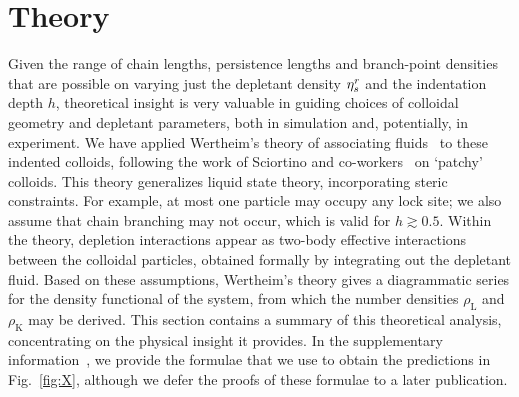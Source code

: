 \documentclass[8.5pt,oneside,onecolumn]{article}
\newcommand{\rhoL}{\rho_\mathrm{L}}
\newcommand{\rhoK}{\rho_\mathrm{K}}
\begin{document}
\section{Theory} \label{sec:theory}

Given the range of chain lengths, persistence lengths and branch-point densities that are
 possible on varying just the
depletant density $\eta_s^r$ and the indentation depth $h$, theoretical
insight is very valuable in guiding choices of colloidal geometry and
depletant parameters, both in simulation and, potentially, in
experiment.  We have applied Wertheim's theory of associating
fluids~\cite{Wertheim} to these indented colloids, following the work
of Sciortino and co-workers~\cite{Bianchi06,Sciortino2007} on `patchy'
colloids.  This theory generalizes liquid state theory, incorporating
steric constraints.  For example,
at most one particle may occupy any lock site; we also assume that
chain branching may not occur, which is valid for $h\gtrsim 0.5$. 
Within the theory, depletion interactions appear as two-body effective interactions
between the colloidal particles, obtained formally by integrating out
the depletant fluid.  Based on these assumptions, Wertheim's theory
gives a diagrammatic series for the density functional of the system,
from which the number densities $\rhoL$ and $\rhoK$ may be derived.
%
This section contains a summary of this theoretical analysis, concentrating on the physical
insight it provides.  In the supplementary information~\cite{SI}, we
provide the formulae that we use to obtain the predictions in Fig.~\ref{fig:X}, although 
we defer the proofs of these formulae to a later publication.
\end{document}
